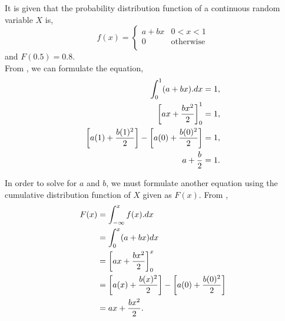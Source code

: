%
%

\begin{subquestions}
	
\subquestion

\begin{subsubquestions}
	
\subsubquestion
It is given that the probability distribution function of a continuous random variable $X$ is,
\[
f(x) =
\begin{cases}
	a+bx & \text{$0<x<1$} \\
	0    & \text{otherwise} \\
\end{cases}
\]
and $F(0.5)=0.8.$ \\

From , we can formulate the equation,
\begin{align}
	\int_{0}^{1} (a+bx).dx = 1, \nonumber \\
	\left[ax + \frac{bx^2}{2}\right]_0^1 = 1, \nonumber \\
	\left[a(1) + \frac{b(1)^2}{2}\right] - \left[a(0) + \frac{b(0)^2}{2}\right]= 1, \nonumber \\
	a + \frac{b}{2} = 1. \label{2015:q4:eqn:crv1}
\end{align}

In order to solve for $a$ and $b$, we must formulate another equation using the cumulative distribution function of $X$ given as $F(x)$. From , 
\begin{align}
	F(x) & = \int_{-\infty}^{x} f(x).dx \nonumber \\
	     & = \int_{0}^{x} (a+bx)dx \nonumber \\
	     & = \left[ax + \frac{bx^2}{2}\right]_0^x \nonumber \\
	     & = \left[a(x) + \frac{b(x)^2}{2}\right] - \left[a(0) + \frac{b(0)^2}{2}\right] \nonumber \\
	     & = ax + \frac{bx^2}{2}.
\end{align}


\end{subsubquestions}
\end{subquestions}
